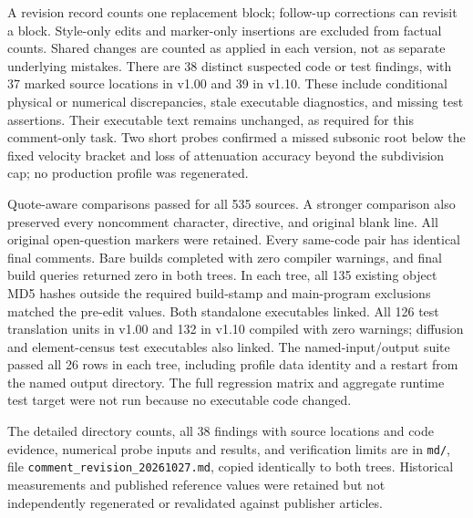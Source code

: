 \documentclass[english,a4paper]{my_memo}
\begin{document}
A revision record counts one replacement block; follow-up corrections can revisit a block. Style-only edits and marker-only insertions are excluded from factual counts. Shared changes are counted as applied in each version, not as separate underlying mistakes. There are 38 distinct suspected code or test findings, with 37 marked source locations in v1.00 and 39 in v1.10. These include conditional physical or numerical discrepancies, stale executable diagnostics, and missing test assertions. Their executable text remains unchanged, as required for this comment-only task. Two short probes confirmed a missed subsonic root below the fixed velocity bracket and loss of attenuation accuracy beyond the subdivision cap; no production profile was regenerated.

Quote-aware comparisons passed for all 535 sources. A stronger comparison also preserved every noncomment character, directive, and original blank line. All original open-question markers were retained. Every same-code pair has identical final comments. Bare builds completed with zero compiler warnings, and final build queries returned zero in both trees. In each tree, all 135 existing object MD5 hashes outside the required build-stamp and main-program exclusions matched the pre-edit values. Both standalone executables linked. All 126 test translation units in v1.00 and 132 in v1.10 compiled with zero warnings; diffusion and element-census test executables also linked. The named-input/output suite passed all 26 rows in each tree, including profile data identity and a restart from the named output directory. The full regression matrix and aggregate runtime test target were not run because no executable code changed.

The detailed directory counts, all 38 findings with source locations and code evidence, numerical probe inputs and results, and verification limits are in \texttt{md/}, file \texttt{comment\_revision\_20261027.md}, copied identically to both trees. Historical measurements and published reference values were retained but not independently regenerated or revalidated against publisher articles.
\end{document}
